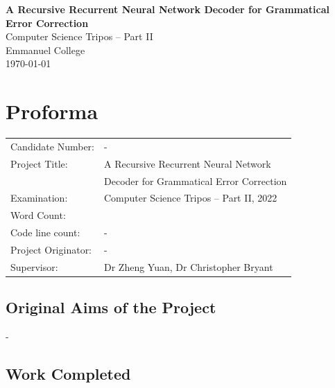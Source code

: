 \documentclass[12pt,a4paper,twoside,openright]{report}
\newcommand{\quickwordcount}[1]{%
  \immediate\write18{texcount -1 -sum -merge -q #1.tex output.bbl > #1-words.sum }%
}
\begin{document}





\pagestyle{empty}


\vspace*{60mm}
\begin{center}
\Huge
\textbf{A Recursive Recurrent Neural Network Decoder for Grammatical Error Correction} \\[5mm]
Computer Science Tripos -- Part II \\[5mm]
Emmanuel College \\[5mm]
\today  %
\end{center}


\pagestyle{plain}

\chapter*{Proforma}

{\large
\begin{tabular}{ll}
Candidate Number:   & -                       \\
Project Title:      & A Recursive Recurrent Neural Network \\
 & Decoder for Grammatical Error Correction \\
Examination:        & Computer Science Tripos -- Part II, 2022  \\
Word Count:         & \quickwordcount{diss}\footnotemark[1] \\
Code line count:    & - \\
Project Originator: & - \\
Supervisor:         & Dr Zheng Yuan, Dr Christopher Bryant
\end{tabular}
}


\section*{Original Aims of the Project}

-


\section*{Work Completed}
\end{document}
